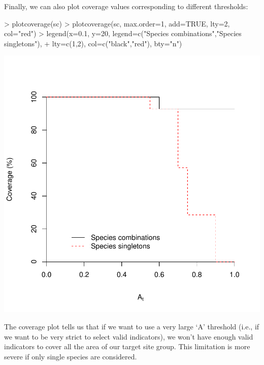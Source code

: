 \documentclass[11pt,a4paper]{article}
\begin{document}
Finally, we can also plot coverage values corresponding to different thresholds:
\begin{center}
\begin{Schunk}
\begin{Sinput}
> plotcoverage(sc)
> plotcoverage(sc, max.order=1, add=TRUE, lty=2, col="red")
> legend(x=0.1, y=20, legend=c("Species combinations","Species singletons"), 
+        lty=c(1,2), col=c("black","red"), bty="n")
\end{Sinput}
\end{Schunk}
\includegraphics{indicspeciesTutorial-032}
\end{center}
The coverage plot tells us that if we want to use a very large `A' threshold (i.e., if we want to be very strict to select valid indicators), we won't have enough valid indicators to cover all the area of our target site group. This limitation is more severe if only single species are considered.
\end{document}
